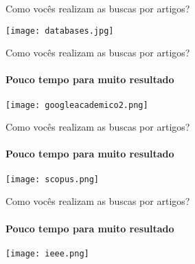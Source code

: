 \begin{frame}[c]{Como vocês realizam as buscas por artigos?} 
    \transdissolve[duration=0.5]
   
    \centering
    \texttt{[image: databases.jpg]}
\end{frame}
\begin{frame}[c]{Como vocês realizam as buscas por artigos?} 
    \framesubtitle{Pouco tempo para muito resultado}
    \transdissolve[duration=0.5]
   
    \centering
    \texttt{[image: googleacademico2.png]}
\end{frame}
\begin{frame}[c]{Como vocês realizam as buscas por artigos?} 
    \framesubtitle{Pouco tempo para muito resultado}
    \transdissolve[duration=0.5]
   
    \centering
    \texttt{[image: scopus.png]}
\end{frame}
\begin{frame}[c]{Como vocês realizam as buscas por artigos?} 
    \framesubtitle{Pouco tempo para muito resultado}
    \transdissolve[duration=0.5]
   
    \centering
    \texttt{[image: ieee.png]}
\end{frame}
